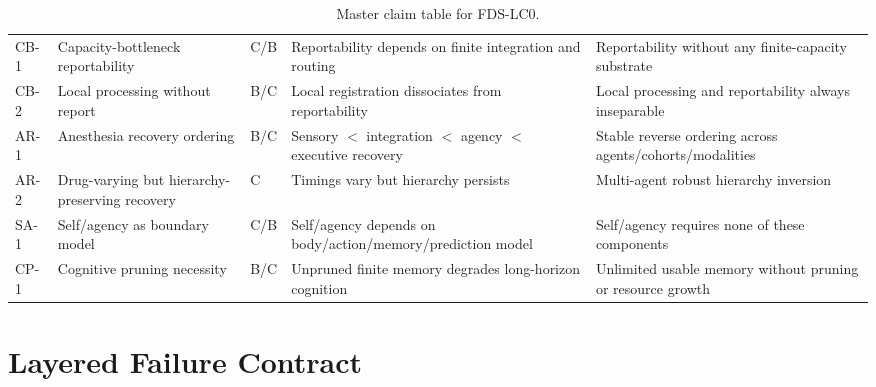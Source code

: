 \documentclass[10pt,a4paper,twocolumn,aps,prl]{revtex4-2}
\theoremstyle{claimstyle}
\theoremstyle{definition}
\newcommand{\LC}{FDS-LC0}
\begin{document}
\begin{table}[t]
\begin{tabular}{lllll}
CB-1 & \parbox[t]{2.8cm}{\raggedright Capacity-bottleneck reportability} & C/B & \parbox[t]{4.8cm}{\raggedright Reportability depends on finite integration and routing} & \parbox[t]{5.5cm}{\raggedright Reportability without any finite-capacity substrate} \\
CB-2 & \parbox[t]{2.8cm}{\raggedright Local processing without report} & B/C & \parbox[t]{4.8cm}{\raggedright Local registration dissociates from reportability} & \parbox[t]{5.5cm}{\raggedright Local processing and reportability always inseparable} \\
AR-1 & \parbox[t]{2.8cm}{\raggedright Anesthesia recovery ordering} & B/C & \parbox[t]{4.8cm}{\raggedright Sensory $<$ integration $<$ agency $<$ executive recovery} & \parbox[t]{5.5cm}{\raggedright Stable reverse ordering across agents/cohorts/modalities} \\
AR-2 & \parbox[t]{2.8cm}{\raggedright Drug-varying but hierarchy-preserving recovery} & C & \parbox[t]{4.8cm}{\raggedright Timings vary but hierarchy persists} & \parbox[t]{5.5cm}{\raggedright Multi-agent robust hierarchy inversion} \\
SA-1 & \parbox[t]{2.8cm}{\raggedright Self/agency as boundary model} & C/B & \parbox[t]{4.8cm}{\raggedright Self/agency depends on body/action/memory/prediction model} & \parbox[t]{5.5cm}{\raggedright Self/agency requires none of these components} \\
CP-1 & \parbox[t]{2.8cm}{\raggedright Cognitive pruning necessity} & B/C & \parbox[t]{4.8cm}{\raggedright Unpruned finite memory degrades long-horizon cognition} & \parbox[t]{5.5cm}{\raggedright Unlimited usable memory without pruning or resource growth} \\
\bottomrule
\end{tabular}
\caption{Master claim table for \LC.}
\end{table}

\section{Layered Failure Contract}
\end{document}
